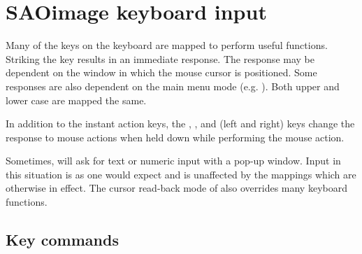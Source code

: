 \section{ SAOimage keyboard input } \label{kbd-sec}

Many of the keys on the keyboard are mapped to perform useful functions.
Striking the key results in an immediate response.  The response may be
dependent on the window in which the mouse cursor is positioned.  Some
responses are also dependent on the main menu mode (e.g. ).  Both
upper and lower case are mapped the same.

In addition to the instant action keys, the , ,
and  (left and right) keys change the response to mouse actions
when held down while performing the mouse action.

Sometimes, {\SAO} will ask for text or numeric input with a pop-up
window.  Input in this situation is as one would expect and is
unaffected by the mappings which are otherwise in effect.  The cursor
read-back mode of {\IRAF} also overrides many keyboard functions.

\subsection{ Key commands } \label{key-sec}

